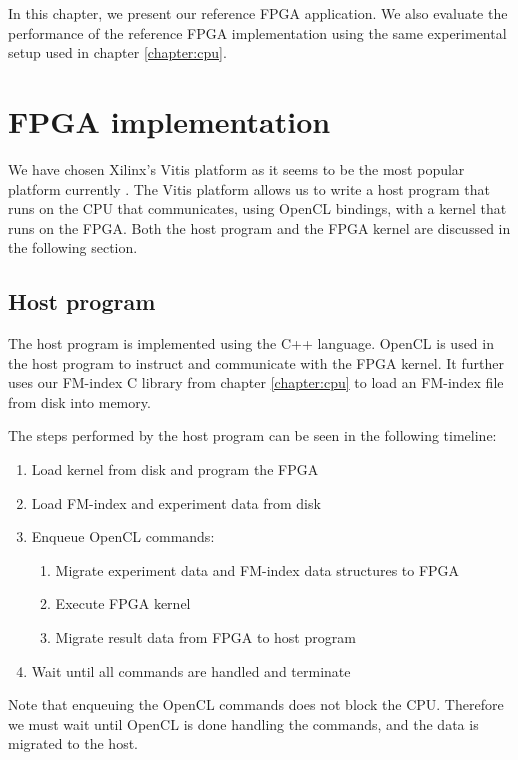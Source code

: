 In this chapter, we present our reference FPGA application.
We also evaluate the performance of the reference FPGA implementation using the same experimental setup used in chapter \ref{chapter:cpu}.

\section{FPGA implementation} \label{section:reference_fpga}

We have chosen Xilinx's Vitis platform as it seems to be the most popular platform currently \cite{noauthor_vitis_nodate}.
The Vitis platform allows us to write a host program that runs on the CPU that communicates, using OpenCL bindings, with a kernel that runs on the FPGA.
Both the host program and the FPGA kernel are discussed in the following section.

\subsection{Host program} \label{section:fpga_host}

The host program is implemented using the C++ language.
OpenCL is used in the host program to instruct and communicate with the FPGA kernel.
It further uses our FM-index C library from chapter \ref{chapter:cpu} to load an FM-index file from disk into memory.

The steps performed by the host program can be seen in the following timeline:

\begin{enumerate}
  \item Load kernel from disk and program the FPGA
  \item Load FM-index and experiment data from disk
  \item Enqueue OpenCL commands:
  \begin{enumerate}
    \item Migrate experiment data and FM-index data structures to FPGA
    \item Execute FPGA kernel
    \item Migrate result data from FPGA to host program
  \end{enumerate}
  \item Wait until all commands are handled and terminate
\end{enumerate}

Note that enqueuing the OpenCL commands does not block the CPU.
Therefore we must wait until OpenCL is done handling the commands, and the data is migrated to the host.

